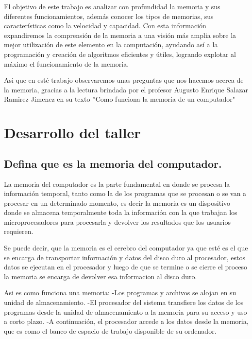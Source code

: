 \documentclass{article}
\begin{document}
El objetivo de este trabajo es analizar con profundidad la memoria y sus diferentes funcionamientos, además conocer los tipos de memorias, sus características como la velocidad y capacidad. Con esta información expandiremos la comprensión de la memoria a una visión más amplia sobre la mejor utilización de este elemento en la computación, ayudando así a la programación y creación de algoritmos eficientes y útiles, logrando explotar al máximo el funcionamiento de la memoria.

Asi que en esté trabajo observaremos unas preguntas que nos hacemos acerca de la memoria, gracias a la  lectura  brindada por el profesor Augusto  Enrique  Salazar  Ramirez  Jimenez  en  su  texto \cite{funcionamiento} ”Como  funciona  la  memoria  de  un computador"
\newpage


\section{Desarrollo del taller} \label{contenido}

\subsection{Defina que es la memoria del computador.}
La memoria del computador es la parte fundamental en donde se procesa la  información  temporal,  tanto  como  la  de  los  programas  que  se  procesan  o  se van a procesar en un determinado momento, es decir la memoria es un dispositivo donde se almacena temporalmente toda la información con la que trabajan los microprocesadores para procesarla y devolver los resultados que los usuarios requieren.

Se puede decir, que la memoria es el cerebro del computador ya que esté es el que se encarga de transportar información y datos del disco duro al procesador, estos datos se ejecutan en el procesador y luego de que se termine o se cierre el proceso la memoria se encarga de devolver esa informacion al disco duro.

Asi es como funciona una memoria:
\newline-Los programas y archivos se alojan en su unidad de almacenamiento.
\newline-El procesador del sistema transfiere los datos de los programas desde la unidad de almacenamiento a la memoria para su acceso y uso a corto plazo.
\newline-A continuación, el procesador accede a los datos desde la memoria, que es como el banco de espacio de trabajo disponible de su ordenador.
\end{document}

